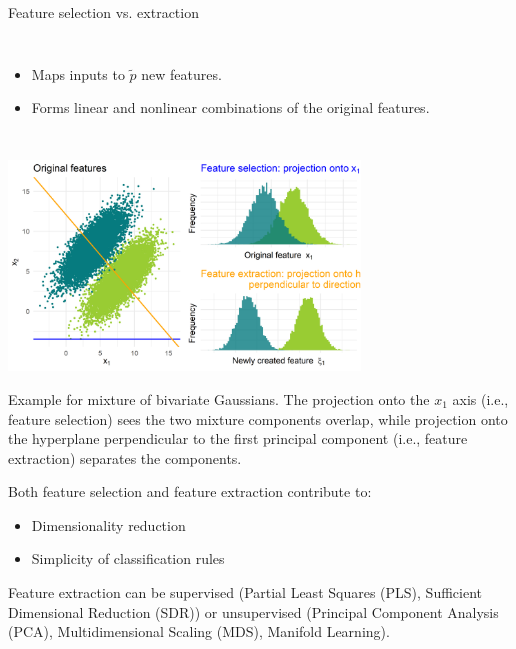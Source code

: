 \begin{vbframe}{Feature selection vs. extraction}
\begin{columns}
\smallskip

\begin{itemize}
  \item Maps inputs to $\tilde{p}$ new features.
  \item Forms linear and nonlinear combinations of the original features.
\end{itemize}

\end{columns}

% 

\framebreak

\begin{center}
\includegraphics[width = 0.7\textwidth]{figure_man/feature_sel_vs_extr.png}
\end{center}

\footnotesize{Example for mixture of bivariate Gaussians. The projection onto the $x_1$ axis (i.e., feature selection) sees the two mixture components overlap, while projection onto the hyperplane perpendicular to the first principal component (i.e., feature extraction) separates the components.}

\normalsize

\framebreak

Both feature selection and feature extraction contribute to:

\begin{itemize}
  \item Dimensionality reduction
  \item Simplicity of classification rules
\end{itemize}

Feature extraction can be supervised (Partial Least Squares (PLS), Sufficient Dimensional Reduction (SDR)) or unsupervised (Principal Component Analysis (PCA), Multidimensional Scaling (MDS), Manifold Learning).

\end{vbframe}



